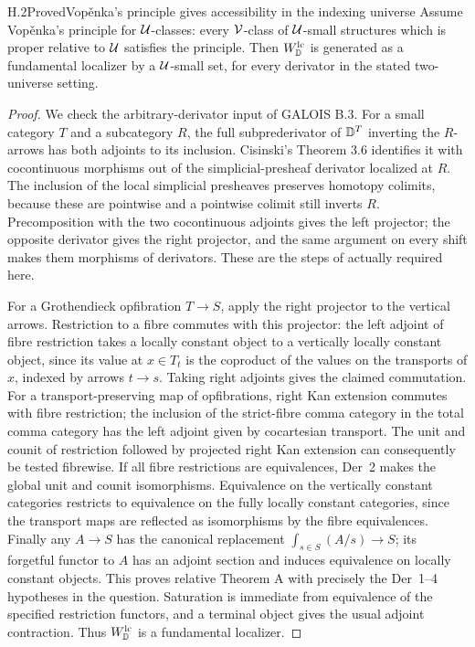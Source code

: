 \begin{claim}{H.2}{Proved}{Vop\v{e}nka's principle gives accessibility in the indexing universe}
Assume Vop\v{e}nka's principle for $\mathcal U$-classes: every $\mathcal V$-class of $\mathcal U$-small structures which is proper relative to $\mathcal U$ satisfies the principle. Then $W^{\mathrm{lc}}_\mathbb D$ is generated as a fundamental localizer by a $\mathcal U$-small set, for every derivator in the stated two-universe setting.
\end{claim}
\begin{proof}
We check the arbitrary-derivator input of GALOIS B.3. For a small category $T$ and a subcategory $R$, the full subprederivator of $\mathbb D^T$ inverting the $R$-arrows has both adjoints to its inclusion. Cisinski's Theorem 3.6 identifies it with cocontinuous morphisms out of the simplicial-presheaf derivator localized at $R$. The inclusion of the local simplicial presheaves preserves homotopy colimits, because these are pointwise and a pointwise colimit still inverts $R$. Precomposition with the two cocontinuous adjoints gives the left projector; the opposite derivator gives the right projector, and the same argument on every shift makes them morphisms of derivators. These are the steps of \cite[Theorem 3.6, Lemma 3.9, and Theorem 3.13]{FGHCisinski2009} actually required here.

For a Grothendieck opfibration $T\to S$, apply the right projector to the vertical arrows. Restriction to a fibre commutes with this projector: the left adjoint of fibre restriction takes a locally constant object to a vertically locally constant object, since its value at $x\in T_t$ is the coproduct of the values on the transports of $x$, indexed by arrows $t\to s$. Taking right adjoints gives the claimed commutation. For a transport-preserving map of opfibrations, right Kan extension commutes with fibre restriction; the inclusion of the strict-fibre comma category in the total comma category has the left adjoint given by cocartesian transport. The unit and counit of restriction followed by projected right Kan extension can consequently be tested fibrewise. If all fibre restrictions are equivalences, Der~2 makes the global unit and counit isomorphisms. Equivalence on the vertically constant categories restricts to equivalence on the fully locally constant categories, since the transport maps are reflected as isomorphisms by the fibre equivalences. Finally any $A\to S$ has the canonical replacement $\int_{s\in S}(A/s)\to S$; its forgetful functor to $A$ has an adjoint section and induces equivalence on locally constant objects. This proves relative Theorem A with precisely the Der~1--4 hypotheses in the question. Saturation is immediate from equivalence of the specified restriction functors, and a terminal object gives the usual adjoint contraction. Thus $W^{\mathrm{lc}}_\mathbb D$ is a fundamental localizer.


\end{proof}
